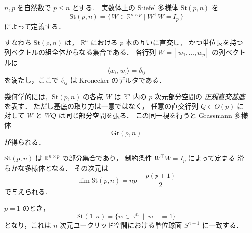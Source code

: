 \begin{definition}
$n,p$ を自然数で $p\le n$ とする．
実数体上の Stiefel 多様体 $\mathrm{St}(p,n)$ を
\[
\mathrm{St}(p,n)
=
\{\, W\in\mathbb{R}^{n\times p}\mid W^\top W = I_p \,\}
\]
によって定義する．
\end{definition}

\noindent
すなわち $\mathrm{St}(p,n)$ は，
$\mathbb{R}^n$ における $p$ 本の互いに直交し，
かつ単位長を持つ列ベクトルの組全体からなる集合である．
各行列 $W=[w_1,\dots,w_p]$ の列ベクトルは
\[
\langle w_i , w_j \rangle = \delta_{ij}
\]
を満たし，ここで $\delta_{ij}$ は Kronecker のデルタである．

\begin{remark}
幾何学的には，$\mathrm{St}(p,n)$ の各点 $W$ は
$\mathbb{R}^n$ 内の $p$ 次元部分空間の
\emph{正規直交基底}を表す．
ただし基底の取り方は一意ではなく，
任意の直交行列 $Q\in O(p)$ に対して
$W$ と $WQ$ は同じ部分空間を張る．
この同一視を行うと Grassmann 多様体
\[
\mathrm{Gr}(p,n)
\]
が得られる．
\end{remark}

\begin{remark}
$\mathrm{St}(p,n)$ は
$\mathbb{R}^{n\times p}$ の部分集合であり，
制約条件 $W^\top W=I_p$ によって定まる
滑らかな多様体となる．
その次元は
\[
\dim \mathrm{St}(p,n)=np-\frac{p(p+1)}{2}
\]
で与えられる．
\end{remark}

\begin{example}
$p=1$ のとき，
\[
\mathrm{St}(1,n)=\{w\in\mathbb{R}^n\mid \|w\|=1\}
\]
となり，これは $n$ 次元ユークリッド空間における単位球面 $S^{n-1}$ に一致する．
\end{example}
